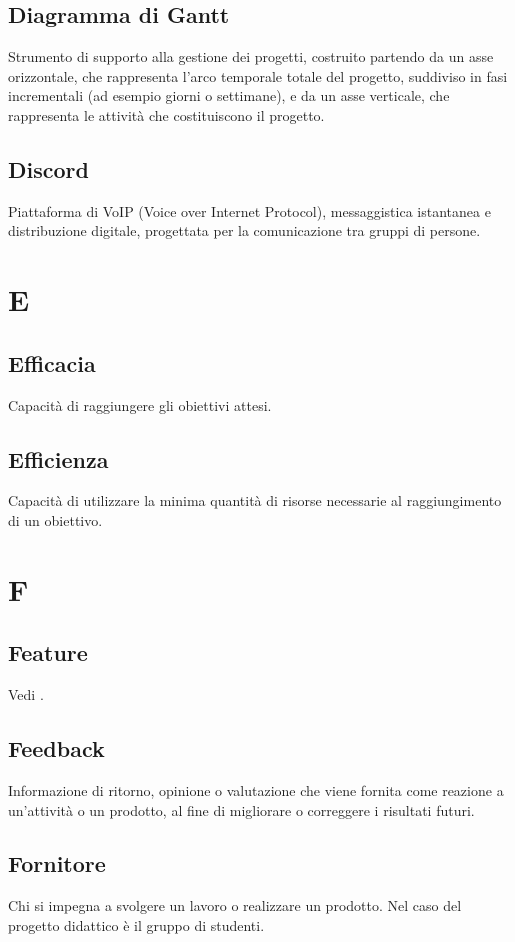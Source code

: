     \subsection{Diagramma di Gantt}
    Strumento di supporto alla gestione dei progetti, costruito partendo da 
    un asse orizzontale, che rappresenta l'arco temporale totale del progetto, 
    suddiviso in fasi incrementali (ad esempio giorni o settimane), e da un asse 
    verticale, che rappresenta le attività che costituiscono il progetto.
    \subsection{Discord}
    Piattaforma di VoIP (Voice over Internet Protocol), messaggistica istantanea 
    e distribuzione digitale, progettata per la comunicazione tra gruppi di persone.
\pagebreak
\section{E}
    \subsection{Efficacia}
    Capacità di raggiungere gli obiettivi attesi.
    \subsection{Efficienza}
    Capacità di utilizzare la minima quantità di risorse necessarie al raggiungimento
    di un obiettivo.
\pagebreak
\section{F}
    \subsection{Feature}
    Vedi .
    \subsection{Feedback}
    Informazione di ritorno, opinione o valutazione che viene fornita come reazione a 
    un'attività o un prodotto, al fine di migliorare o correggere i risultati futuri.
    \subsection{Fornitore}
    Chi si impegna a svolgere un lavoro o realizzare un prodotto. Nel caso del progetto didattico
    è il gruppo di studenti.
